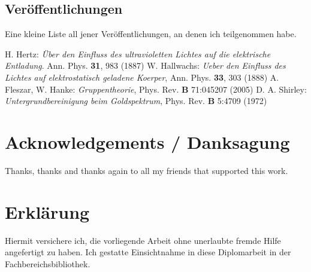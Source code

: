 \documentclass[11pt,twoside,german]{book}
\begin{document}
\section{Veröffentlichungen}

Eine kleine Liste all jener Veröffentlichungen, an denen ich teilgenommen habe.

\begin{thebibliography}{99}
   H. Hertz: {\itshape Über den Einfluss des ultravioletten Lichtes 
	auf die elektrische Entladung}. Ann. Phys. {\bfseries 31}, 983 (1887)
   W. Hallwachs: {\itshape Ueber den Einfluss des Lichtes auf 
	elektrostatisch geladene Koerper}, Ann. Phys. {\bfseries 33}, 303 (1888)
   A. Fleszar, W. Hanke: {\itshape Gruppentheorie}, Phys. Rev. 
	{\bfseries B} 71:045207 (2005)
   D. A. Shirley: {\itshape Untergrundbereinigung beim Goldspektrum},
	Phys. Rev. {\bfseries B} 5:4709 (1972)
\end{thebibliography}

\pagestyle{empty}

\chapter*{Acknowledgements / Danksagung}

Thanks, thanks and thanks again to all my friends that supported this work.

\chapter*{Erklärung}

Hiermit versichere ich, die vorliegende Arbeit ohne unerlaubte fremde Hilfe angefertigt zu haben. Ich gestatte Einsichtnahme in diese Diplomarbeit in der Fachbereichsbibliothek.
\end{document}
